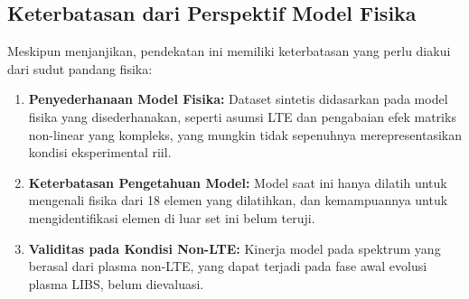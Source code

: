 \subsection{Keterbatasan dari Perspektif Model Fisika}
Meskipun menjanjikan, pendekatan ini memiliki keterbatasan yang perlu diakui dari sudut pandang fisika:
\begin{enumerate}
    \item \textbf{Penyederhanaan Model Fisika:} Dataset sintetis didasarkan pada model fisika yang disederhanakan, seperti asumsi LTE dan pengabaian efek matriks non-linear yang kompleks, yang mungkin tidak sepenuhnya merepresentasikan kondisi eksperimental riil.
    \item \textbf{Keterbatasan Pengetahuan Model:} Model saat ini hanya dilatih untuk mengenali fisika dari 18 elemen yang dilatihkan, dan kemampuannya untuk mengidentifikasi elemen di luar set ini belum teruji.
    \item \textbf{Validitas pada Kondisi Non-LTE:} Kinerja model pada spektrum yang berasal dari plasma non-LTE, yang dapat terjadi pada fase awal evolusi plasma LIBS, belum dievaluasi.
\end{enumerate}